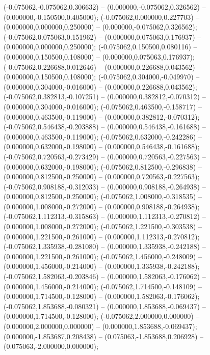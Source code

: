  (-0.075062,-0.075062,0.306632) -- (0.000000,-0.075062,0.326562) -- (0.000000,-0.150500,0.405000);
 (-0.075062,0.000000,0.227703) -- (0.000000,0.000000,0.250000) -- (0.000000,-0.075062,0.326562);
 (-0.075062,0.075063,0.151962) -- (0.000000,0.075063,0.176937) -- (0.000000,0.000000,0.250000);
 (-0.075062,0.150500,0.080116) -- (0.000000,0.150500,0.108000) -- (0.000000,0.075063,0.176937);
 (-0.075062,0.226688,0.012646) -- (0.000000,0.226688,0.043562) -- (0.000000,0.150500,0.108000);
 (-0.075062,0.304000,-0.049970) -- (0.000000,0.304000,-0.016000) -- (0.000000,0.226688,0.043562);
 (-0.075062,0.382813,-0.107251) -- (0.000000,0.382812,-0.070312) -- (0.000000,0.304000,-0.016000);
 (-0.075062,0.463500,-0.158717) -- (0.000000,0.463500,-0.119000) -- (0.000000,0.382812,-0.070312);
 (-0.075062,0.546438,-0.203888) -- (0.000000,0.546438,-0.161688) -- (0.000000,0.463500,-0.119000);
 (-0.075062,0.632000,-0.242286) -- (0.000000,0.632000,-0.198000) -- (0.000000,0.546438,-0.161688);
 (-0.075062,0.720563,-0.273429) -- (0.000000,0.720563,-0.227563) -- (0.000000,0.632000,-0.198000);
 (-0.075062,0.812500,-0.296838) -- (0.000000,0.812500,-0.250000) -- (0.000000,0.720563,-0.227563);
 (-0.075062,0.908188,-0.312033) -- (0.000000,0.908188,-0.264938) -- (0.000000,0.812500,-0.250000);
 (-0.075062,1.008000,-0.318535) -- (0.000000,1.008000,-0.272000) -- (0.000000,0.908188,-0.264938);
 (-0.075062,1.112313,-0.315863) -- (0.000000,1.112313,-0.270812) -- (0.000000,1.008000,-0.272000);
 (-0.075062,1.221500,-0.303538) -- (0.000000,1.221500,-0.261000) -- (0.000000,1.112313,-0.270812);
 (-0.075062,1.335938,-0.281080) -- (0.000000,1.335938,-0.242188) -- (0.000000,1.221500,-0.261000);
 (-0.075062,1.456000,-0.248009) -- (0.000000,1.456000,-0.214000) -- (0.000000,1.335938,-0.242188);
 (-0.075062,1.582063,-0.203846) -- (0.000000,1.582063,-0.176062) -- (0.000000,1.456000,-0.214000);
 (-0.075062,1.714500,-0.148109) -- (0.000000,1.714500,-0.128000) -- (0.000000,1.582063,-0.176062);
 (-0.075062,1.853688,-0.080321) -- (0.000000,1.853688,-0.069437) -- (0.000000,1.714500,-0.128000);
 (-0.075062,2.000000,0.000000) -- (0.000000,2.000000,0.000000) -- (0.000000,1.853688,-0.069437);
 (0.000000,-1.853687,0.208438) -- (0.075063,-1.853688,0.206928) -- (0.075063,-2.000000,0.000000);
